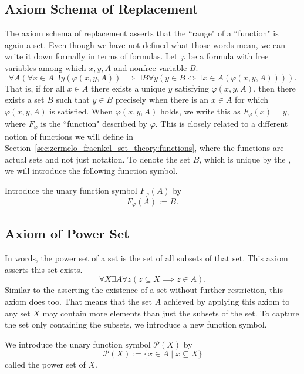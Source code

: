 \documentclass[../main.tex]{subfiles}
\begin{document}
\subsection*{Axiom Schema of Replacement}\label{subsec:zermelo_fraenkel_set_theory:axiom_schema_of_replacement}
The axiom schema of replacement asserts that the ``range" of a ``function" is again a set. Even though we have not defined what those words mean, we can write it down formally in terms of formulas. Let $\varphi$ be a formula with free variables among which $x,y,A$ and nonfree variable $B$.
\begin{equation*}
    \forall A(\forall x\in A\exists!y(\varphi(x,y,A))\implies\exists B\forall y(y\in B\iff\exists x\in A(\varphi(x,y,A)))).
\end{equation*}
That is, if for all $x\in A$ there exists a unique $y$ satisfying $\varphi(x,y,A)$, then there exists a set $B$ such that $y\in B$ precisely when there is an $x\in A$ for which $\varphi(x,y,A)$ is satisfied. When $\varphi(x,y,A)$ holds, we write this as $F_\varphi(x)=y$, where $F_\varphi$ is the ``function" described by $\varphi$. This is closely related to a different notion of functions we will define in Section~\ref{sec:zermelo_fraenkel_set_theory:functions}, where the functions are actual sets and not just notation. To denote the set $B$, which is unique by the , we will introduce the following function symbol.
\begin{definition}
    Introduce the unary function symbol $F_\varphi(A)$ by
    \begin{equation*}
        F_\varphi(A):=B.
    \end{equation*}
\end{definition}

\subsection*{Axiom of Power Set}\label{subsec:zermelo_fraenkel_set_theory:axiom_of_power_set}
In words, the power set of a set is the set of all subsets of that set. This axiom asserts this set exists.
\begin{equation*}
    \forall X\exists A\forall z(z\subseteq X\implies z\in A).
\end{equation*}
Similar to the  asserting the existence of a set without further restriction, this axiom does too. That means that the set $A$ achieved by applying this axiom to any set $X$ may contain more elements than just the subsets of the set. To capture the set only containing the subsets, we introduce a new function symbol.
\begin{definition}
    We introduce the unary function symbol $\mathcal{P}(X)$ by
    \begin{equation*}
        \mathcal{P}(X):=\{x\in A\mid x\subseteq X\}
    \end{equation*}
    called the power set of $X$.
\end{definition}
\end{document}
